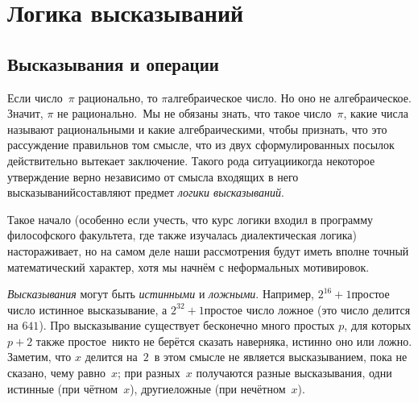 \chapter{Логика высказываний}

\section{Высказывания и операции}

 Если число~$\pi$ рационально, то $\pi$\т алгебраическое число.
Но оно не алгебраическое. Значит, $\pi$ не рационально.\
Мы не обязаны знать, что такое число~$\pi$, какие числа называют
рациональными и какие алгебраическими, чтобы признать, что это
рассуждение правильно\т в том смысле, что из двух
сформулированных посылок действительно вытекает заключение.
Такого рода ситуации\т когда некоторое утверждение верно
независимо от смысла входящих в него высказываний\т составляют
предмет \emph{логики высказываний}.%

Такое начало (особенно если учесть, что курс логики входил в
программу философского факультета, где также изучалась 
диалектическая логика) настораживает, но на самом деле наши
рассмотрения будут иметь вполне точный математический характер,
хотя мы начнём с неформальных мотивировок.

\emph{Высказывания}%
 могут быть \emph{истинными}%
%
и \emph{ложными}.%
%
Например,  $2^{16}+1$\т простое число\т
истинное высказывание, а  $2^{32}+1$\т простое число\т
ложное (это число делится на $641$). Про высказывание \лк
существует бесконечно много простых $p$, для которых $p+2$\т
также простое\ никто не берётся сказать наверняка, истинно
оно или ложно. Заметим, что  $x$ делится на~$2$\пк\ в этом
смысле не является высказыванием, пока не сказано, чему
равно~$x$; при разных~$x$ получаются разные высказывания, одни
истинные (при чётном~$x$), другие\т ложные (при нечётном~$x$).

